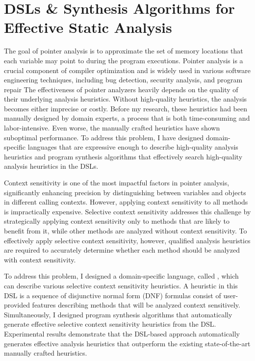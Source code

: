\documentclass[11pt]{article}
\newcommand{\myparagraph}[1]{\medskip\noindent{\it \textbf{#1.}}}
\begin{document}
\section{DSLs \& Synthesis Algorithms for Effective Static Analysis}
%
The goal of pointer analysis is to approximate the set of memory locations that each variable may point to during the program executions.
%
Pointer analysis is a crucial component of compiler optimization and is widely used in various software engineering techniques, including bug detection, security analysis, and program repair
%
The effectiveness of pointer analyzers heavily depends on the quality of their underlying analysis heuristics. 
%
Without high-quality heuristics, the analysis becomes either imprecise or costly. 
%
Before my research, these heuristics had been manually designed by domain experts, a process that is both time-consuming and labor-intensive. 
%
Even worse, the manually crafted heuristics have shown suboptimal performance.
%
To address this problem, I have designed domain-specific languages that are expressive enough to describe high-quality analysis heuristics and program synthesis algorithms that effectively search  high-quality analysis heuristics in the DSLs.



\myparagraph{Disjunctive Model $\&$ Synthesis Algorithms~\cite{JeJeChOh17,Jeon2019,IST2021}}
%
Context sensitivity is one of the most impactful factors in pointer analysis, significantly enhancing precision by distinguishing between variables and objects in different calling contexts.
%
However, applying context sensitivity to all methods is impractically expensive. 
%
Selective context sensitivity addresses this challenge by strategically applying context sensitivity only to methods that are likely to benefit from it, while other methods are analyzed without context sensitivity.
%
To effectively apply selective context sensitivity, however, qualified analysis heuristics are required to accurately determine whether each method should be analyzed with context sensitivity.




To address this problem, I designed a domain-specific language, called \DisjunctiveModel, which can describe various selective context sensitivity heuristics.
%
A heuristic in this DSL is a sequence of disjunctive normal form (DNF) formulas consist of user-provided features describing methods that will be analyzed context sensitively.
%
Simultaneously, I designed program synthesis algorithms that automatically generate effective selective context sensitivity heuristics from the DSL.
%
Experimental results demonstrate that the DSL-based approach automatically generates effective analysis heuristics that outperform the existing state-of-the-art manually crafted heuristics.
\end{document}
